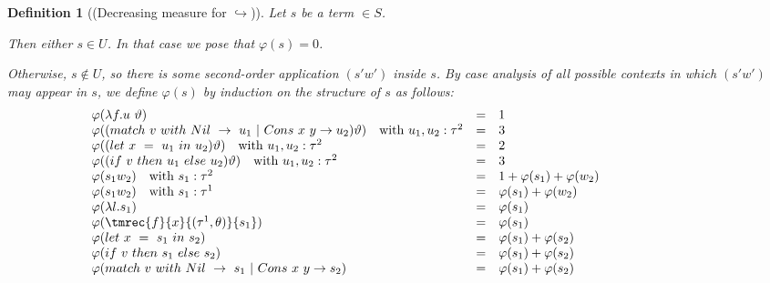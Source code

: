 \documentclass[a4paper,11pt,oneside]{article}
\theoremstyle{plain}
\newtheorem{definition}{Definition}[subsection]
\newcommand{\icarr}{\hookrightarrow}
\begin{document}
\begin{definition}[(Decreasing measure for $\icarr$)]
	Let $s$ be a term $\in S$. 
	
	Then either $s \in U$. In that case we pose that $\varphi(s) = 0$.
	
	Otherwise,  $s \not\in U$, so there is some second-order application $(s' w')$ inside $s$. 
	By case analysis of all possible contexts in which $(s' w')$ may appear in $s$, we define $\varphi(s)$ by induction on the structure of $s$ as follows:
\begin{displaymath}
	\begin{array}{lll@{\hspace*{3cm}}l}
	\varphi(\lambda f. u~\vartheta) &=& 1 \\ 
	 
	\varphi((match~v~with~Nil~->~u_1~|~Cons~x~y -> u_2) \vartheta) \quad \text{with}~u_1, u_2:\tau^2 &=& 3 \\
	 
	\varphi((let~x~=~u_1~in~u_2) \vartheta) \quad \text{with}~u_1, u_2:\tau^2 &=& 2 \\
	 
	\varphi((if~v~then~u_1~else~u_2) \vartheta) \quad \text{with}~u_1, u_2:\tau^2 &=& 3 \\
	 
	\varphi(s_1 w_2) \quad \text{with}~s_1:\tau^2  &=& 1 + \varphi(s_1) + \varphi(w_2) \ \\
	
	\varphi(s_1 w_2) \quad \text{with}~s_1:\tau^1  &=& \varphi(s_1) + \varphi(w_2) \ \\	 
	 
	\varphi(\lambda l. s_1) &=& \varphi(s_1) \\  
	
	\varphi(\tmrec{f}{x}{(\tau^1, \theta)}{s_1}) &=& \varphi(s_1) \\ 	 
	 
	\varphi(let~x~=~s_1~in~s_2) &=& \varphi(s_1) + \varphi(s_2) \\
	 
	\varphi(if~v~then~s_1~else~s_2) &=& \varphi(s_1) + \varphi(s_2) \\

	\varphi(match~v~with~Nil~->~s_1~|~Cons~x~y -> s_2) &=& \varphi(s_1) + \varphi(s_2) \\
	\end{array}
\end{displaymath}	
	\end{definition}	
\end{document}
